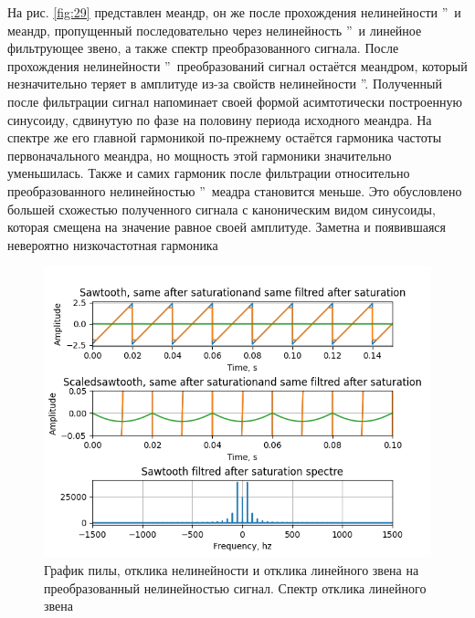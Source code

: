 На рис. \ref{fig:29} представлен меандр, он же после прохождения
нелинейности \textquotedblright\ и меандр,
пропущенный последовательно через нелинейность
\textquotedblright\ и 
линейное фильтрующее звено, а также спектр преобразованного сигнала.
После прохождения нелинейности \textquotedblright\
преобразований сигнал остаётся меандром, который незначительно теряет в амплитуде
из-за свойств нелинейности \textquotedblleftНасыщение\textquotedblright.
Полученный после фильтрации сигнал напоминает своей формой асимтотически
построенную синусоиду, сдвинутую по фазе на половину периода исходного меандра.
На спектре же его главной гармоникой по-прежнему остаётся гармоника частоты
первоначального меандра, но мощность этой гармоники значительно уменьшилась.
Также и самих гармоник после фильтрации относительно преобразованного нелинейностью
\textquotedblleftНасыщение\textquotedblright\ меадра становится
меньше. Это обусловлено большей схожестью полученного сигнала с каноническим
видом синусоиды, которая смещена на значение равное своей амплитуде.
Заметна и появившаяся невероятно низкочастотная гармоника

\begin{figure}[H]
	\centering
	\includegraphics[width=0.95\linewidth]{body/images/sawtooth-after-filtred-saturation-and-its-spectre.png}
	\caption{График пилы, отклика нелинейности и отклика линейного звена на преобразованный
	нелинейностью сигнал. Спектр отклика линейного звена}
	\label{fig:30}
\end{figure}

